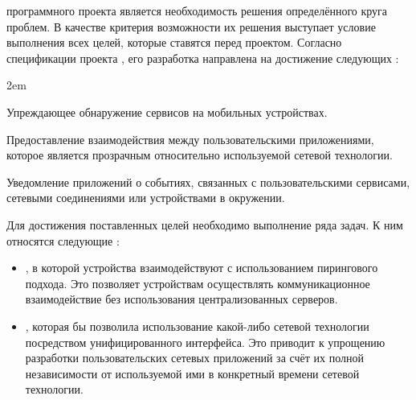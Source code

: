 %
 программного проекта является необходимость решения определённого круга проблем.
%
В качестве критерия возможности их решения выступает условие выполнения всех целей, которые ставятся перед проектом.
%
Согласно спецификации проекта , его разработка направлена на достижение следующих  
: 
\begin{description}
	\leftskip2em%
	\setlength{\itemsep}{0pt}%
	\setlength{\parsep}{0pt}%
	
	\item[\EnglishText{Proactivity}] Упреждающее обнаружение сервисов на мобильных устройствах.
	
	\item[\EnglishText{Connectivity}] Предоставление взаимодействия между пользовательскими приложениями, которое является прозрачным относительно используемой сетевой технологии.
	
	\item[\EnglishText{Reactivity}] Уведомление приложений о событиях, связанных с пользовательскими сервисами, сетевыми соединениями или устройствами в окружении.
\end{description}

%
Для достижения поставленных целей необходимо выполнение ряда задач.
%
К ним относятся следующие :
\begin{itemize}
	
	\item {}, в которой устройства взаимодействуют с использованием пирингового подхода.
	Это позволяет устройствам осуществлять коммуникационное взаимодействие без использования централизованных серверов.
	
	\item {}, которая бы позволила использование какой-либо сетевой технологии посредством унифицированного интерфейса.
	Это приводит к упрощению разработки пользовательских сетевых приложений за счёт их полной независимости от используемой ими в конкретный времени сетевой технологии.
\end{itemize}

